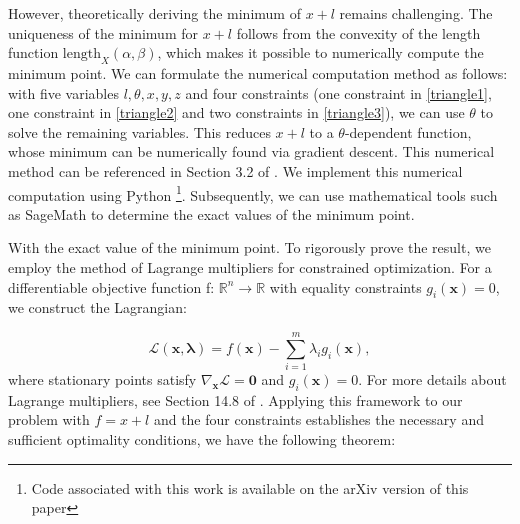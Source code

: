 \documentclass[11pt,reqno]{amsart}
\theoremstyle{plain}
\theoremstyle{definition}
\theoremstyle{remark}
\numberwithin{equation}{section}
\numberwithin{figure}{section}
\begin{document}
However, theoretically deriving the minimum of $x+l$ remains challenging. The uniqueness of the minimum for $x+l$ follows from the convexity of the length function $\text{length}_X(\alpha,\beta)$, which makes it possible to numerically compute the minimum point. We can formulate the numerical computation method as follows: with five variables $l,\theta,x,y,z$ and four constraints (one constraint in \eqref{triangle1}, one constraint in \eqref{triangle2} and two constraints in \eqref{triangle3}), we can use $\theta$ to solve the remaining variables. This reduces $x+l$ to a $\theta$-dependent function, whose minimum can be numerically found via gradient descent. This numerical method can be referenced in Section 3.2 of \cite{AnIhringerIrmer2025}. We implement this numerical computation using Python \footnote{Code associated with this work is available on the arXiv version of this paper}. Subsequently, we can use mathematical tools such as SageMath to determine the exact values of the minimum point.


With the exact value of the minimum point. To rigorously prove the result, we employ the method of Lagrange multipliers for constrained optimization. For a differentiable objective function f: $\mathbb{R}^n \rightarrow \mathbb{R}$ with equality constraints $g_i(\mathbf{x})=0$, we construct the Lagrangian:

\[
\mathcal{L}(\mathbf{x},\boldsymbol{\lambda})=f(\mathbf{x})-\sum_{i=1}^{m}\lambda_{i}g_{i}(\mathbf{x}),
\]
where stationary points satisfy $\nabla_{\!\mathbf{x}}\mathcal{L}=\mathbf{0}$ and $g_i(\mathbf{x})=0$. For more details about Lagrange multipliers, see Section 14.8 of \cite{hass2017thomas}. Applying this framework to our problem with $f=x+l$ and the four constraints  establishes the necessary and sufficient optimality conditions, we have the following theorem:
\end{document}

